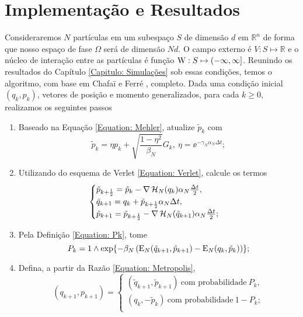 \chapter{Implementação e Resultados}
\label{Capitulo: Resultados}

Consideraremos $N$ partículas em um subespaço $S$ de dimensão $d$ em $\mathbb{R}^n$ de forma que nosso espaço de fase $\Omega$ será de dimensão $Nd$. O campo externo é $V : S \mapsto \mathbb{R}$ e o núcleo de interação entre as partículas é função $\operatorname{W} : S \mapsto (-\infty, \infty]$. Reunindo os resultados do Capítulo \ref{Capitulo: Simulações} sob essas condições, temos o algoritmo, com base em Chafa\"{i} e Ferré \cite{Chafa2018}, completo. Dada uma condição inicial $(q_k, p_k)$,  vetores de posição e momento generalizados, para cada $k\geq0$, realizamos os seguintes passos
\begin{enumerate}
	\item Baseado na Equação \eqref{Equation: Mehler}, atualize $\tilde{p}_k$ com
	\begin{equation}
	\tilde{p}_k = \eta p_k + \sqrt{\frac{1-\eta^2}{\beta_N}} G_k, \ \eta = \ee^{-\gamma_N \alpha_N \Delta t};
	\label{Equation: Alg Mehler}
	\end{equation}
	\item Utilizando do esquema de Verlet \eqref{Equation: Verlet}, calcule os termos
	\begin{equation}
	\begin{cases}
		\tilde{p}_{k+\frac{1}{2}} = \tilde{p}_k - \nabla \operatorname{\mathcal{H}}_N(q_k) \alpha_N \frac{\Delta t}{2}, \\
		\tilde{q}_{k+1} = q_k + \tilde{p}_{k + \frac{1}{2}} \alpha_N \Delta t, \\
		\tilde{p}_{k+1} = \tilde{p}_{k+\frac{1}{2}} - \nabla \operatorname{\mathcal{H}}_N(\tilde{q}_{k+1}) \alpha_N \frac{\Delta t}{2};
		\label{Equation: Alg Verlet}
	\end{cases}
	\end{equation}
	\item Pela Definição \eqref{Equation: Pk}, tome
	\begin{equation}
	P_k = 1 \wedge \exp{ -\beta_N \left(\operatorname{E}_N(\tilde{q}_{k+1}, \tilde{p}_{k+1}) - \operatorname{E}_N(q_{k}, \tilde{p}_{k}) \right)};
	\label{Equação: Alg Pk}
	\end{equation}
	\item Defina, a partir da Razão \eqref{Equation: Metropolis}, 
	\begin{equation}
	(q_{k+1}, p_{k+1}) = 
	\begin{cases}
		(\tilde{q}_{k+1}, \tilde{p}_{k+1}) \ \text{com probabilidade} \ P_k, \\
		(q_k, -\tilde{p}_{k}) \ \text{com probabilidade} \ 1-P_k; \\
	\end{cases}
	\label{Equation: Alg Metro}
	\end{equation}
\end{enumerate}


